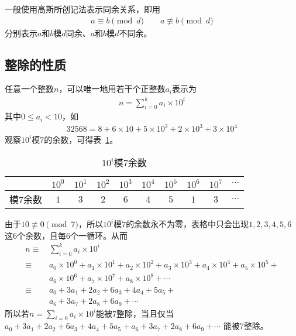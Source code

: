 一般使用高斯所创记法表示同余关系，即用
\begin{align*}
  a \equiv b \pmod d \quad\quad a\not\equiv b\pmod d
\end{align*}
分别表示$a$和$b$模$d$同余、$a$和$b$模$d$不同余。

\subsection{整除的性质}
\begin{example}[被$7$整除]\label{ex:divided-by-7}
  任意一个整数$n$，可以唯一地用若干个正整数$a_i$表示为
  \begin{align*}
    n=\sum_{i=0}^{k} a_i\times 10^i
  \end{align*}
  其中$0\le a_i<10$，如
  \begin{align*}
    32568 = 8 + 6\times 10 + 5\times 10^2 + 2\times 10^3 + 3\times10^4
  \end{align*}
  观察$10^i$模$7$的余数，可得表~\ref{tab:10^i-modular-7}。

  \begin{table}[htbp]
    \centering
    \caption{$10^i$模$7$余数}
    \label{tab:10^i-modular-7}
    \begin{tabular}{cccccccccc}
      \toprule
                & $10^0$ & $10^1$ & $10^2$ & $10^3$ & $10^4$ & $10^5$ & $10^6$ & $10^7$ & $\cdots$ \\ \midrule
      模$7$余数 & $1$    & $3$    & $2$    & $6$    & $4$    & $5$    & $1$    & $3$    & $\cdots$ \\ 
      \bottomrule
    \end{tabular}
  \end{table}

  由于$10\not\equiv0\pmod7$，所以$10^i$模$7$的余数永不为零，表格中只会出现$1,2,3,4,5,6$这$6$个余数，且每$6$个一循环。从而
  \begin{align*}
    n\equiv\,&\sum_{i=0}^{k} a_i\times10^i\tag*{$\pmod7$}\\
     \equiv\,& a_0\times10^0 + a_1\times10^1 + a_2\times10^2 + a_3\times10^3 + a_4\times10^4 + a_5\times10^5 +\\
             & a_6\times10^6 + a_7\times10^7 + a_8\times10^8 + \cdots \tag*{$\pmod7$}\\
     \equiv\,& a_0 + 3a_1 + 2a_2 + 6a_3 + 4a_4 + 5a_5 +\\
             & a_6 + 3a_7 + 2a_8 + 6a_9 + \cdots\tag*{$\pmod7$}
  \end{align*}
  所以若$n=\sum\limits_{i=0}a_i\times10^i$能被$7$整除，当且仅当
  $a_0 + 3a_1 + 2a_2 + 6a_3 + 4a_4 + 5a_5 + a_6 + 3a_7 + 2a_8 + 6a_9 + \cdots$
  能被$7$整除。
\end{example}

